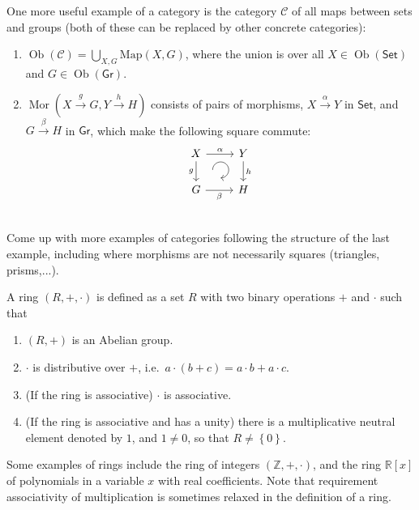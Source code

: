 \documentclass[english,letterpaper]{article}%
\numberwithin{equation}{section}
\numberwithin{figure}{section}
\numberwithin{table}{section}
\theoremstyle{definition}
\theoremstyle{definition}
\theoremstyle{definition}
\theoremstyle{plain}
\theoremstyle{plain}
\theoremstyle{plain}
\theoremstyle{plain}
\theoremstyle{remark}
\theoremstyle{remark}
\DeclareMathOperator{\mor}{Mor}
\DeclareMathOperator{\ob}{Ob}
\begin{document}
%
\begin{example}
One more useful example of a category is the category $\mathcal{C}$
of all maps between sets and groups (both of these can be replaced
by other concrete categories):
\begin{enumerate}
\item $\ob\left(\mathcal{C}\right)=\bigcup_{X,G}\mathrm{Map}\left(X,G\right)$,
where the union is over all $X\in\ob\left(\mathsf{Set}\right)$ and
$G\in\ob\left(\mathsf{Gr}\right)$.
\item $\mor\left(X\overset{g}{\to}G,Y\overset{h}{\to}H\right)$ consists
of pairs of morphisms, $X\overset{\alpha}{\to}Y$ in $\mathsf{Set}$,
and $G\overset{\beta}{\to}H$ in $\mathsf{Gr}$, which make the following
square commute: \[\begin{tikzcd}[every matrix/.append style={name=m},   
execute at end picture={\draw [<-] ([xshift=-2em,yshift=1mm]m-2-2.north) arc[start angle=-90,delta angle=270,radius=0.25cm];}]
   X \arrow[r,"\alpha"]\arrow[d,swap,"g"]& Y\arrow[d,"h"] \\
   G\arrow[r,swap,"\beta"]& H\\
\end{tikzcd}\]
\end{enumerate}
\end{example}
\begin{xca}
Come up with more examples of categories following the structure of
the last example, including where morphisms are not necessarily squares
(triangles, prisms,...).
\end{xca}
\begin{defn}[Rings]
A ring $(R,+,\cdot)$ is defined as a set $R$ with two binary operations
$+$ and $\cdot$ such that 
\begin{enumerate}
\item $(R,+)$ is an Abelian group.
\item $\cdot$ is distributive over $+$, i.e.\ $a\cdot(b+c)=a\cdot b+a\cdot c$.
\item (If the ring is associative) $\cdot$ is associative.
\item (If the ring is associative and has a unity) there is a multiplicative
neutral element denoted by $1$, and $1\neq0$, so that $R\neq\left\{ 0\right\} $.
\end{enumerate}
\end{defn}
Some examples of rings include the ring of integers $(\mathbb{Z},+,\cdot)$,
and the ring $\mathbb{R}[x]$ of polynomials in a variable $x$ with
real coefficients. Note that requirement associativity of multiplication
is sometimes relaxed in the definition of a ring.
\end{document}
